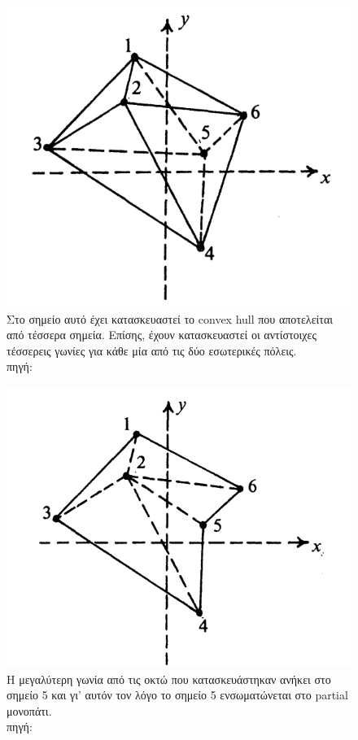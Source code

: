 \documentclass[oneside,12pt]{book}
\newenvironment{matlab}
	{\begin{figure}[hp]\centering\captionsetup{justification=centering}}
	{\end{figure}}
\theoremstyle{definition}
\begin{document}
\begin{matlab}
	\includegraphics[scale=0.5]{images/geometric_approach_angle2.png}
	\caption{Στο σημείο αυτό έχει κατασκευαστεί το convex hull που αποτελείται από τέσσερα σημεία. Επίσης, έχουν κατασκευαστεί οι αντίστοιχες τέσσερεις γωνίες για κάθε μία από τις δύο εσωτερικές πόλεις. \\ πηγή: \cite{16}}
\end{matlab} 

\begin{matlab}
	\includegraphics[scale=0.5]{images/geometric_approach_angle3.png}
	\caption{Η μεγαλύτερη γωνία από τις οκτώ που κατασκευάστηκαν ανήκει στο σημείο 5 και γι' αυτόν τον λόγο το σημείο 5 ενσωματώνεται στο partial μονοπάτι. \\ πηγή: \cite{16}}
\end{matlab} 
\end{document}
